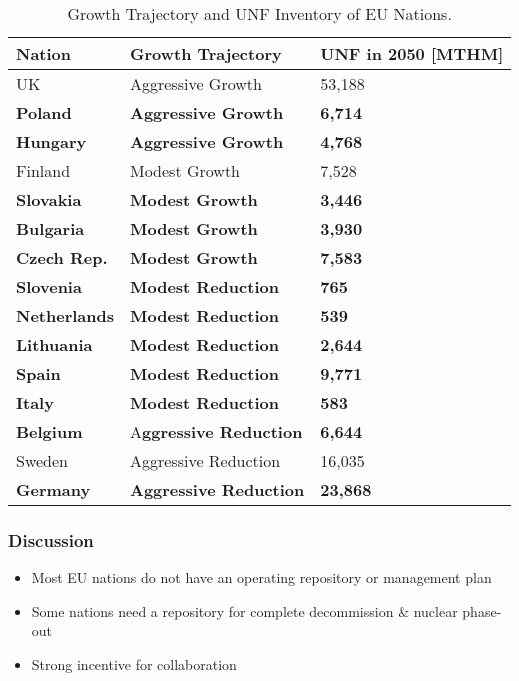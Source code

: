 \begin{frame}
\begin{table}[h]
\begin{adjustbox}{max totalsize={1.1\textwidth}{.8\textheight}, center}
\begin{tabularx}{\textwidth}{lbb}
                    \textbf{Nation} & \textbf{Growth Trajectory} & \small{\textbf{UNF in 2050 [MTHM] }}\\
                    \hline
                    UK & Aggressive Growth & 53,188\\
                    \hline
                    \textbf{Poland} & \textbf{Aggressive Growth} &  \textbf{6,714}\\
                    \hline
                    \textbf{Hungary} & \textbf{Aggressive Growth} & \textbf{4,768} \\ 
                    \hline
                    Finland & Modest Growth &  7,528\\
                    \hline
                    \textbf{Slovakia} & \textbf{Modest Growth} & \textbf{3,446}\\
                    \hline
                   \textbf{Bulgaria} & \textbf{Modest Growth} & \textbf{3,930} \\
                    \hline
                    \textbf{Czech Rep.} & \textbf{Modest Growth} & \textbf{7,583}\\
                    \hline
                    \textbf{Slovenia} & \textbf{Modest Reduction} & \textbf{765}\\
                    \hline
                    \textbf{Netherlands} & \textbf{Modest Reduction} & \textbf{539}\\
                    \hline
                    \textbf{Lithuania} & \textbf{Modest Reduction} & \textbf{2,644}\\
                    \hline 
                    \textbf{Spain} & \textbf{Modest Reduction} &  \textbf{9,771} \\
                    \hline
                    \textbf{Italy} & \textbf{Modest Reduction} & \textbf{583}\\
                    \hline
                    \textbf{Belgium} & A\textbf{ggressive Reduction} & \textbf{6,644}\\
                    \hline
                    Sweden & Aggressive Reduction & 16,035\\
                    \hline
                    \textbf{Germany} & \textbf{Aggressive Reduction} & \textbf{23,868}\\
                    \hline
                    
                \end{tabularx}
    \end{adjustbox}
    \caption {Growth Trajectory and UNF Inventory of \gls{EU} Nations.}
    \label{tab:which_count}
\end{table}
\end{frame}


\begin{frame}
	\frametitle{Discussion}
	\begin{itemize}
		\item Most EU nations do not have an operating repository or management plan
		\item Some nations need a repository for complete decommission \& nuclear phase-out	
		\item Strong incentive for collaboration
	\end{itemize}
\end{frame}